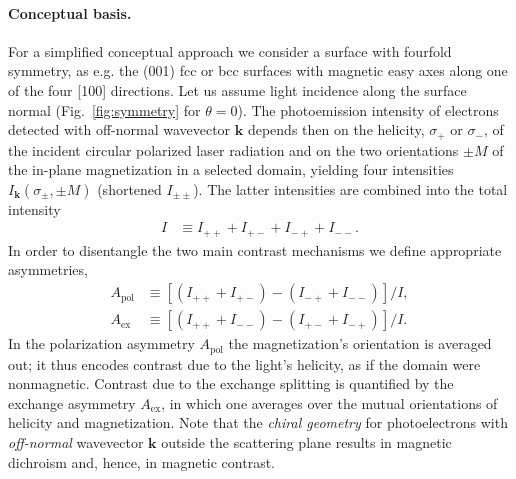 \documentclass[prl,twocolumn,floatfix,superscriptaddress]{revtex4-2}
\renewcommand{\vec}[1]{\boldsymbol{#1}}
\begin{document}
\paragraph{Conceptual basis.} For a simplified conceptual approach we consider a surface with fourfold symmetry, as e.g. the (001) fcc or bcc surfaces with magnetic easy axes along one of the four [100] directions. Let us assume light incidence along the surface normal (Fig.~\ref{fig:symmetry} for $\theta = 0$). The photoemission intensity of electrons detected with off-normal wavevector $\vec{k}$ depends then on the helicity, $\sigma_{+}$ or $\sigma_{-}$, of the incident circular polarized laser radiation and on the two orientations $\pm M$ of the in-plane magnetization in a selected domain, yielding four intensities $I_{\vec{k}}(\sigma_{\pm}, \pm M)$ (shortened $I_{\pm \pm}$). The latter intensities are combined into the total intensity
\begin{align}
    I & \equiv I_{+ +} + I_{+ -} + I_{- +} + I_{- -}. 
\end{align}
In order to disentangle the two main contrast mechanisms we define appropriate asymmetries,
\begin{subequations}
\begin{align}
    A_{\mathrm{pol}} & \equiv \left[ \left( I_{+ +} + I_{+ -} \right) - \left( I_{- +} + I_{- -} \right) \right] / I,
    \label{eq:Apol}
    \\
    A_{\mathrm{ex}} & \equiv \left[ \left( I_{+ +} + I_{- -} \right) - \left( I_{+ -} + I_{- +} \right) \right] / I.
    \label{eq:Aex}
\end{align}    
\end{subequations}
In the polarization asymmetry $A_{\mathrm{pol}}$ the magnetization's orientation is averaged out; it thus encodes contrast due to the light's helicity, as if the domain were nonmagnetic. Contrast due to the exchange splitting is quantified by the exchange asymmetry $A_{\mathrm{ex}}$, in which one averages over the mutual orientations of helicity and magnetization. Note that the \emph{chiral geometry} for photoelectrons with \emph{off-normal} wavevector $\vec{k}$ outside the scattering plane results in magnetic dichroism and, hence, in magnetic contrast.
\end{document}
